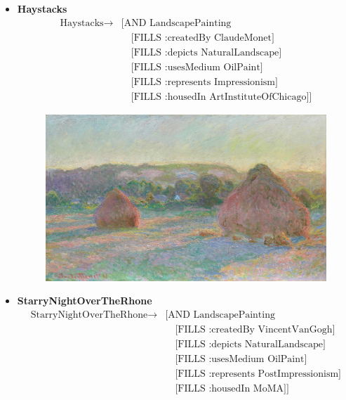 \begin{itemize}
\begin{figure}[H]
        \end{figure}
      \pagebreak
      \item \textbf{Haystacks}
        \begin{align*}
          \text{Haystacks} \to& \text{[AND LandscapePainting}\\
          &\quad\text{[FILLS :createdBy ClaudeMonet]}\\
          &\quad\text{[FILLS :depicts NaturalLandscape]}\\
          &\quad\text{[FILLS :usesMedium OilPaint]}\\
          &\quad\text{[FILLS :represents Impressionism]}\\
          &\quad\text{[FILLS :housedIn ArtInstituteOfChicago]]}
        \end{align*}
        \begin{figure}[H]
          \centering
          \includegraphics[width=\linewidth]{images/haystacks.jpg}
        \end{figure}
      \pagebreak
      \item \textbf{StarryNightOverTheRhone}
        \begin{align*}
          \text{StarryNightOverTheRhone} \to& \text{[AND LandscapePainting}\\
          &\quad\text{[FILLS :createdBy VincentVanGogh]}\\
          &\quad\text{[FILLS :depicts NaturalLandscape]}\\
          &\quad\text{[FILLS :usesMedium OilPaint]}\\
          &\quad\text{[FILLS :represents PostImpressionism]}\\
          &\quad\text{[FILLS :housedIn MoMA]]}
        \end{align*}
        \begin{figure}[H]

\end{figure}
\end{itemize}
